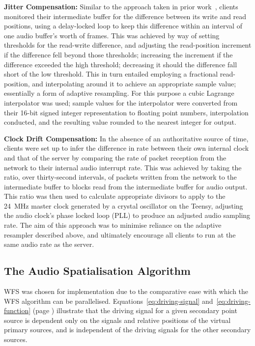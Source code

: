\documentclass[utf8]{FrontiersinHarvard}
\begin{document}
    \textbf{Jitter Compensation:}
    Similar to the approach taken in prior
    work~\citep{rushton_microcontroller-based_2023}, clients monitored their
    intermediate buffer for the difference between its write and read positions,
    using a delay-locked loop to keep this difference within an interval of
    one audio buffer's worth of frames.
    This was achieved by way of setting thresholds for the read-write difference,
    and adjusting the read-position increment if the difference fell beyond those
    thresholds;
    increasing the increment if the difference exceeded the high threshold;
    decreasing it should the difference fall short of the low threshold.
    This in turn entailed employing a fractional read-position, and interpolating
    around it to achieve an appropriate sample value; essentially a form of adaptive
    resampling.
    For this purpose a cubic Lagrange interpolator was used; sample values for the
    interpolator were converted from their 16-bit signed integer representation
    to floating point numbers, interpolation conducted, and the resulting value
    rounded to the nearest integer for output.

    \textbf{Clock Drift Compensation:}
    In the absence of an authoritative source of time, clients were set up to infer
    the difference in rate between their own internal clock and that of the server
    by comparing the rate of packet reception from the network to their internal
    audio interrupt rate.
    This was achieved by taking the ratio, over thirty-second intervals, of
    packets written from the network to the intermediate buffer to blocks read
    from the intermediate buffer for audio output.
    This ratio was then used to calculate appropriate divisors to apply to the
    \qty{24}{\MHz} master clock generated by a crystal oscillator on the Teensy,
    adjusting the audio clock's phase locked loop (PLL) to produce an adjusted audio
    sampling rate.
    The aim of this approach was to minimise reliance on the adaptive resampler
    described above, and ultimately encourage all clients to run at the same audio
    rate as the server.

    \subsection{The Audio Spatialisation Algorithm}\label{subsec:wfs-algorithm}

    WFS was chosen for implementation due to the comparative ease with which the
    WFS algorithm can be parallelised.
    Equations~\eqref{eq:driving-signal} and~\eqref{eq:driving-function} (page
    \pageref{eq:driving-signal}) illustrate that the driving signal for a given
    secondary point source is dependent only on the signals and relative
    positions of the virtual primary sources, and is independent of the driving
    signals for the other secondary sources.
\end{document}
